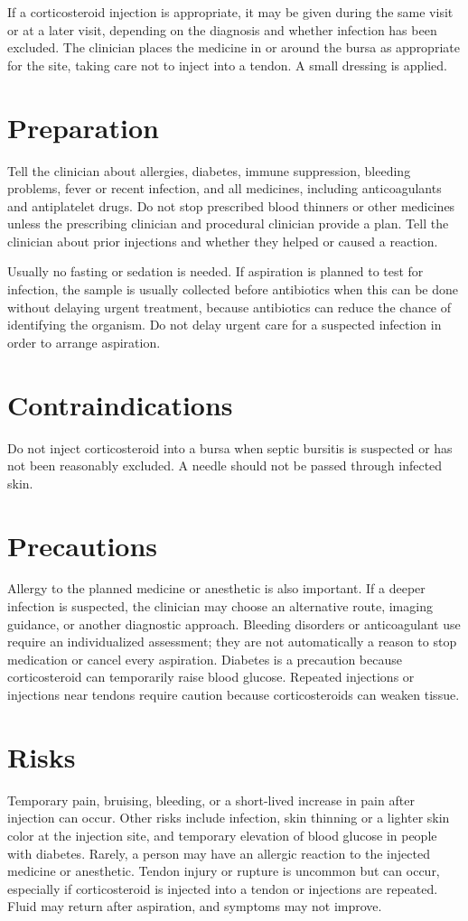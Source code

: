 If a corticosteroid injection is appropriate, it may be given during the same visit or at a later visit, depending on the diagnosis and whether infection has been excluded. The clinician places the medicine in or around the bursa as appropriate for the site, taking care not to inject into a tendon. A small dressing is applied.

\section*{Preparation}
Tell the clinician about allergies, diabetes, immune suppression, bleeding problems, fever or recent infection, and all medicines, including anticoagulants and antiplatelet drugs. Do not stop prescribed blood thinners or other medicines unless the prescribing clinician and procedural clinician provide a plan. Tell the clinician about prior injections and whether they helped or caused a reaction.

Usually no fasting or sedation is needed. If aspiration is planned to test for infection, the sample is usually collected before antibiotics when this can be done without delaying urgent treatment, because antibiotics can reduce the chance of identifying the organism. Do not delay urgent care for a suspected infection in order to arrange aspiration.

\section*{Contraindications}
Do not inject corticosteroid into a bursa when septic bursitis is suspected or has not been reasonably excluded. A needle should not be passed through infected skin.

\section*{Precautions}
Allergy to the planned medicine or anesthetic is also important. If a deeper infection is suspected, the clinician may choose an alternative route, imaging guidance, or another diagnostic approach. Bleeding disorders or anticoagulant use require an individualized assessment; they are not automatically a reason to stop medication or cancel every aspiration. Diabetes is a precaution because corticosteroid can temporarily raise blood glucose. Repeated injections or injections near tendons require caution because corticosteroids can weaken tissue.

\section*{Risks}
Temporary pain, bruising, bleeding, or a short-lived increase in pain after injection can occur. Other risks include infection, skin thinning or a lighter skin color at the injection site, and temporary elevation of blood glucose in people with diabetes. Rarely, a person may have an allergic reaction to the injected medicine or anesthetic. Tendon injury or rupture is uncommon but can occur, especially if corticosteroid is injected into a tendon or injections are repeated. Fluid may return after aspiration, and symptoms may not improve.

